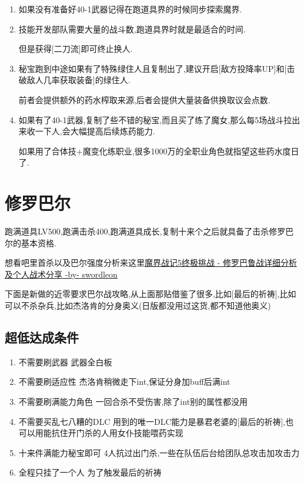 	\begin{enumerate}
		\item
		如果没有准备好40-1武器记得在跑道具界的时候同步探索魔界.

		\item
		技能开发部队需要大量的战斗数,跑道具界时就是最适合的时间.

		但是获得[二刀流]即可终止换人.

		\item
		秘宝跑到中途如果有了特殊绿住人且复制出了,建议开启[敌方投降率UP]和[击破敌人几率获取装备]的绿住人.

		前者会提供额外的药水榨取来源,后者会提供大量装备供换取议会点数.

		\item
		如果有了40-1武器,复制了些不错的秘宝,而且买了练了魔女,那么每5场战斗拉出来收一下人,会大幅提高后续炼药能力.

		如果用了合体技+魔变化练职业,很多1000万的全职业角色就指望这些药水度日了.

	\end{enumerate}


	\newpage

	\section{修罗巴尔}

	跑满道具LV500,跑满击杀400,跑满道具成长,复制十来个之后就具备了击杀修罗巴尔的基本资格.

	想看吧里首杀以及巴尔强度分析来这里\href{http://tieba.baidu.com/p/3949061316}{魔界战记5终极挑战 - 修罗巴鲁战详细分析及个人战术分享 -by- swordleon }

	下面是新做的近零要求巴尔战攻略,从上面那贴借鉴了很多,比如[最后的祈祷],比如可以不杀杂兵,比如杰洛肯的分身奥义(日版都没用过这货,都不知道他奥义)

	\subsection{超低达成条件}
	\begin{enumerate}
		\item{不需要刷武器}
		武器全白板

		\item{不需要刷适应性}
		杰洛肯稍微走下int,保证分身加buff后满int

		\item{不需要刷满能力角色}
		一回合杀不受伤害,除了int别的属性都没用

		\item{不需要买乱七八糟的DLC}
		用到的唯一DLC能力是暴君老婆的[最后的祈祷],也可以用能抗住开门杀的人用女仆技能喂药实现

		\item{十来件满能力秘宝即可}
		4人抗过出门杀,一些在队伍后台给团队总攻击加攻击力

		\item{全程只挂了一个人}
		为了触发最后的祈祷
	\end{enumerate}

